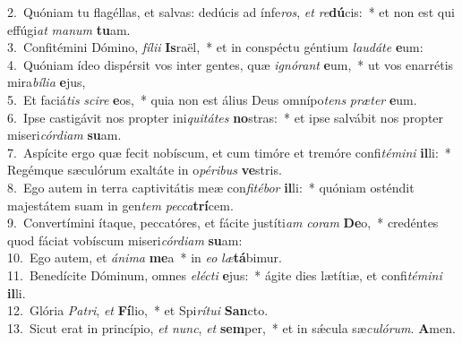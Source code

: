 {2.~}Quóniam tu flagéllas, et salvas: dedúcis ad ínfe\textit{ros}, \textit{et} \textit{re}\textbf{dú}cis:~* et non est qui effúgi\textit{at} \textit{ma}\textit{num} \textbf{tu}am.\\
{3.~}Confitémini Dómino, \textit{fí}\textit{li}\textit{i} \textbf{Is}raël,~* et in conspéctu géntium \textit{lau}\textit{dá}\textit{te} \textbf{e}um:\\
{4.~}Quóniam ídeo dispérsit vos inter gentes, quæ \textit{i}\textit{gnó}\textit{rant} \textbf{e}um,~* ut vos enarrétis mira\textit{bí}\textit{li}\textit{a} \textbf{e}jus,\\
{5.~}Et faciá\textit{tis} \textit{sci}\textit{re} \textbf{e}os,~* quia non est álius Deus omnípo\textit{tens} \textit{præ}\textit{ter} \textbf{e}um.\\
{6.~}Ipse castigávit nos propter ini\textit{qui}\textit{tá}\textit{tes} \textbf{no}stras:~* et ipse salvábit nos propter miseri\textit{cór}\textit{di}\textit{am} \textbf{su}am.\\
{7.~}Aspícite ergo quæ fecit nobíscum, et cum timóre et tremóre confi\textit{té}\textit{mi}\textit{ni} \textbf{il}li:~* Regémque sæculórum exaltáte in o\textit{pé}\textit{ri}\textit{bus} \textbf{ve}stris.\\
{8.~}Ego autem in terra captivitátis meæ con\textit{fi}\textit{té}\textit{bor} \textbf{il}li:~* quóniam osténdit majestátem suam in gen\textit{tem} \textit{pec}\textit{ca}\textbf{trí}cem.\\
{9.~}Convertímini ítaque, peccatóres, et fácite justíti\textit{am} \textit{co}\textit{ram} \textbf{De}o,~* credéntes quod fáciat vobíscum miseri\textit{cór}\textit{di}\textit{am} \textbf{su}am:\\
{10.~}Ego autem, et \textit{á}\textit{ni}\textit{ma} \textbf{me}a~* in \textit{e}\textit{o} \textit{læ}\textbf{tá}bimur.\\
{11.~}Benedícite Dóminum, omnes \textit{e}\textit{lé}\textit{cti} \textbf{e}jus:~* ágite dies lætítiæ, et confi\textit{té}\textit{mi}\textit{ni} \textbf{il}li.\\
{12.~}Glória \textit{Pa}\textit{tri}, \textit{et} \textbf{Fí}lio,~* et Spi\textit{rí}\textit{tu}\textit{i} \textbf{San}cto.\\
{13.~}Sicut erat in princípio, \textit{et} \textit{nunc}, \textit{et} \textbf{sem}per,~* et in sǽcula sæ\textit{cu}\textit{ló}\textit{rum}. \textbf{A}men.\\
